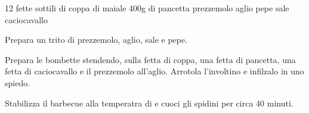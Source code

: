 \vegetarian
\freeze
\begin{ingreds}
	12 fette sottili di coppa di maiale
	400g di pancetta
	prezzemolo
	aglio
	pepe
	sale
	caciocavallo

\end{ingreds}

\begin{method}
Prepara un trito di prezzemolo, aglio, sale e pepe.

Prepara le bombette stendendo, sulla fetta di coppa, una fetta di pancetta, una fetta di caciocavallo e il prezzemolo all'aglio. Arrotola l'involtino e infilzalo in uno spiedo.

Stabilizza il barbecue alla temperatra di  e cuoci gli spidini per circa 40 minuti.
\end {method}
